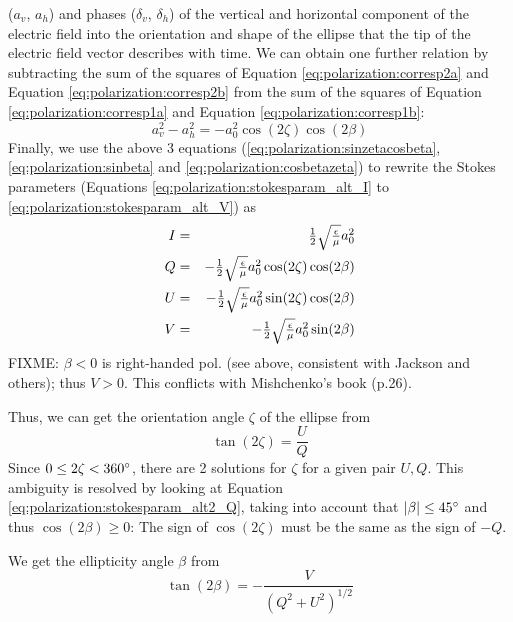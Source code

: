 ($a_v$, $a_h$) and phases ($\delta_v$, $\delta_h$) of the vertical and
horizontal component of the electric field into the orientation and
shape of the ellipse that the tip of the electric field vector describes with
time.  We can obtain one further relation by subtracting the sum of
the squares of Equation \ref{eq:polarization:corresp2a} and
Equation \ref{eq:polarization:corresp2b} from the sum of the squares of
Equation \ref{eq:polarization:corresp1a} and
Equation \ref{eq:polarization:corresp1b}:
\begin{equation}
  \label{eq:polarization:cosbetazeta}
 a_v^2 - a_h^2 =  -a_0^2 \cos(2\zeta)\cos(2\beta)
\end{equation}
Finally, we use the above 3 equations
(\ref{eq:polarization:sinzetacosbeta}, 
\ref{eq:polarization:sinbeta} and 
\ref{eq:polarization:cosbetazeta}) to rewrite the Stokes parameters
(Equations \ref{eq:polarization:stokesparam_alt_I} to
\ref{eq:polarization:stokesparam_alt_V}) 
as
\begin{eqnarray}
  \label{eq:polarization:stokesparam_alt2_I}
 I &=&  \textstyle\frac{1}{2}\sqrt{\textstyle{\frac{\epsilon}{\mu}}} a_0^2\\
  \label{eq:polarization:stokesparam_alt2_Q}
 Q &=&  - \textstyle\frac{1}{2}\sqrt{\textstyle{\frac{\epsilon}{\mu}}} a_0^2 \cos(2\zeta)\cos(2\beta)\\ 
  \label{eq:polarization:stokesparam_alt2_U}
 U &=& -\textstyle\frac{1}{2}\sqrt{\textstyle{\frac{\epsilon}{\mu}}} a_0^2 \sin(2\zeta)\cos(2\beta)\\
  \label{eq:polarization:stokesparam_alt2_V}
 V &=& -\textstyle\frac{1}{2}\sqrt{\textstyle{\frac{\epsilon}{\mu}}} a_0^2 \sin(2\beta)
\end{eqnarray}
FIXME: $\beta<0$ is right-handed pol. (see above, consistent with
Jackson and others); thus $V>0$. This conflicts with Mishchenko's book
(p.26).
  

Thus, we can get the orientation angle $\zeta$ of the ellipse from
\begin{equation}
  \label{eq:polarization:tan2zeta}
 \tan(2\zeta) = \frac{U}{Q}
\end{equation}
Since $0 \leq 2\zeta < 360^\circ$, there are 2 solutions for $\zeta$ for a
given pair $U,Q$. This ambiguity is resolved by looking at
Equation \ref{eq:polarization:stokesparam_alt2_Q}, taking into account that
$|\beta| \leq 45^\circ$ and thus $\cos(2\beta) \geq 0$:
The sign of $\cos(2\zeta)$ must be the same as the sign of $-Q$.

We get the ellipticity angle $\beta$  from
\begin{equation}
  \label{eq:polarization:tan2beta}
 \tan(2\beta) = - \frac{V}{(Q^2 + U^2)^{1/2}}  
\end{equation}

